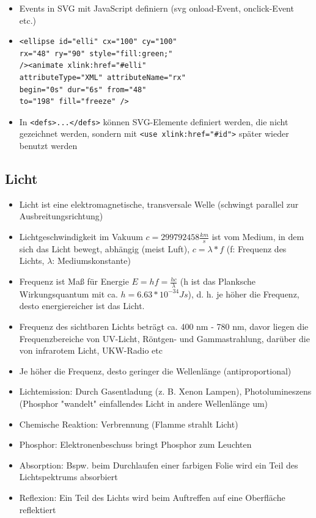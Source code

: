 \documentclass[12pt,landscape]{article}
\begin{document}
\begin{multicols}{3}
\begin{itemize}
\item Events in SVG mit JavaScript definiern (svg onload-Event, onclick-Event etc.)
\item \begin{lstlisting}
<ellipse id="elli" cx="100" cy="100"
rx="48" ry="90" style="fill:green;"
/><animate xlink:href="#elli"
attributeType="XML" attributeName="rx"
begin="0s" dur="6s" from="48"
to="198" fill="freeze" />
\end{lstlisting}
\item In \lstinline|<defs>...</defs>| können SVG-Elemente definiert werden, die nicht gezeichnet werden, sondern mit \lstinline|<use xlink:href="#id">| später wieder benutzt werden
\end{itemize}
\subsection{Licht}
\begin{itemize}
\item Licht ist eine elektromagnetische, transversale Welle (schwingt parallel zur Ausbreitungsrichtung)
\item Lichtgeschwindigkeit im Vakuum $c = 299792458 \frac{km}{s}$ ist vom Medium, in dem sich das Licht bewegt, abhängig (meist Luft), $c = \lambda * f$ (f: Frequenz des Lichts, $\lambda$: Mediumskonstante)
\item Frequenz ist Maß für Energie $E = hf = \frac{h c}{\lambda}$ (h ist das Planksche Wirkungsquantum mit ca. $h = 6.63 * 10^{-34} Js$), d. h. je höher die Frequenz, desto energiereicher ist das Licht.
\item Frequenz des sichtbaren Lichts beträgt ca. 400 nm - 780 nm, davor liegen die Frequenzbereiche von UV-Licht, Röntgen- und Gammastrahlung, darüber die von infrarotem Licht, UKW-Radio etc
\item Je höher die Frequenz, desto geringer die Wellenlänge (antiproportional)
\item Lichtemission: Durch Gasentladung (z. B. Xenon Lampen), Photolumineszens (Phosphor "wandelt" einfallendes Licht in andere Wellenlänge um)
\item Chemische Reaktion: Verbrennung (Flamme strahlt Licht)
\item Phosphor: Elektronenbeschuss bringt Phosphor zum Leuchten
\item Absorption: Bspw. beim Durchlaufen einer farbigen Folie wird ein Teil des Lichtspektrums absorbiert
\item Reflexion: Ein Teil des Lichts wird beim Auftreffen auf eine Oberfläche reflektiert

\end{itemize}
\end{multicols}
\end{document}
